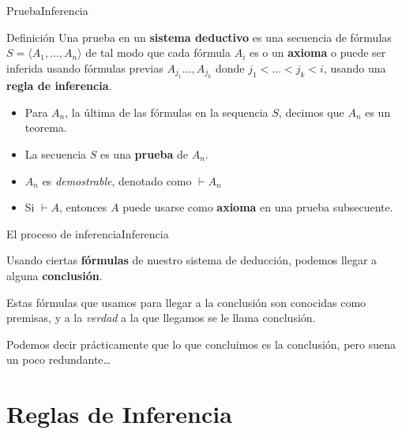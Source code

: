 \documentclass[spanish, c]{beamer}
\begin{document}
\begin{frame}{Prueba}{Inferencia}

    \begin{block}{Definición}
    Una \alert{prueba} en un \textbf{sistema deductivo} es una secuencia de fórmulas $S = \langle A_1, \dots , A_n \rangle$ de tal modo que cada fórmula $A_i$ es o un \textbf{axioma} o puede ser inferida usando fórmulas previas $A_{j_1} \dots , A_{j_k}$ donde $j_1 < \dots < j_k < i$, usando una \textbf{regla de inferencia}.
    \end{block} \pause
    
    \begin{itemize}[<+->]
        \item Para $A_n$, la última de las fórmulas en la sequencia $S$, decimos que $A_n$ es un \alert{teorema}.
        \item La secuencia $S$ es una \textbf{prueba} de $A_n$.
        \item $A_n$ es \textit{demostrable}, denotado como $\vdash A_n$
        \item Si $\vdash A$, entonces $A$ puede usarse como \textbf{axioma} en una prueba subsecuente.
    \end{itemize}

\end{frame}

\begin{frame}{El proceso de inferencia}{Inferencia}

    Usando ciertas \textbf{fórmulas} de nuestro sistema de deducción, podemos llegar a alguna \textbf{conclusión}. \pause

    \bigskip
    
    Estas fórmulas que usamos para llegar a la conclusión son conocidas como \alert{premisas}, y a la \textit{verdad} a la que llegamos se le llama conclusión.

    \bigskip

    \begin{center}
        \footnotesize Podemos decir prácticamente que lo que concluimos es la conclusión, pero suena un poco redundante\dots    
    \end{center}
\end{frame}

\section{Reglas de Inferencia}
\end{document}
